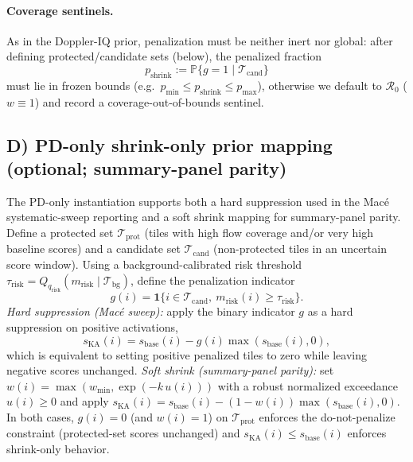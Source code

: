 \documentclass[11pt]{article}
\begin{document}
\paragraph{Coverage sentinels.}
As in the Doppler-IQ prior, penalization must be neither inert nor global: after defining protected/candidate sets (below), the penalized fraction
\[
p_{\mathrm{shrink}} := \mathbb{P}\{g=1\mid \mathcal{T}_{\mathrm{cand}}\}
\]
must lie in frozen bounds (e.g.\ $p_{\min}\le p_{\mathrm{shrink}}\le p_{\max}$), otherwise we default to $\mathcal{R}_0$ ($w\equiv 1$) and record a coverage-out-of-bounds sentinel.

\subsection*{D) PD-only shrink-only prior mapping (optional; summary-panel parity)}
The PD-only instantiation supports both a hard suppression used in the Mac{\'e} systematic-sweep reporting and a soft shrink mapping for summary-panel parity.
Define a protected set $\mathcal{T}_{\mathrm{prot}}$ (tiles with high flow coverage and/or very high baseline scores) and a candidate set $\mathcal{T}_{\mathrm{cand}}$ (non-protected tiles in an uncertain score window). Using a background-calibrated risk threshold $\tau_{\mathrm{risk}}=Q_{q_{\mathrm{risk}}}(m_{\mathrm{risk}}\mid\mathcal{T}_{\mathrm{bg}})$, define the penalization indicator
\[
g(i)=\mathbf{1}\{i\in\mathcal{T}_{\mathrm{cand}},\ m_{\mathrm{risk}}(i)\ge\tau_{\mathrm{risk}}\}.
\]
\emph{Hard suppression (Mac{\'e} sweep):} apply the binary indicator $g$ as a hard suppression on positive activations,
\[
s_{\mathrm{KA}}(i)=s_{\mathrm{base}}(i) - g(i)\max(s_{\mathrm{base}}(i),0),
\]
which is equivalent to setting positive penalized tiles to zero while leaving negative scores unchanged. \emph{Soft shrink (summary-panel parity):} set $w(i)=\max(w_{\min},\exp(-k\,u(i)))$ with a robust normalized exceedance $u(i)\ge 0$ and apply $s_{\mathrm{KA}}(i)=s_{\mathrm{base}}(i)-(1-w(i))\max(s_{\mathrm{base}}(i),0)$. In both cases, $g(i)=0$ (and $w(i)=1$) on $\mathcal{T}_{\mathrm{prot}}$ enforces the do-not-penalize constraint (protected-set scores unchanged) and $s_{\mathrm{KA}}(i)\le s_{\mathrm{base}}(i)$ enforces shrink-only behavior.
\end{document}
